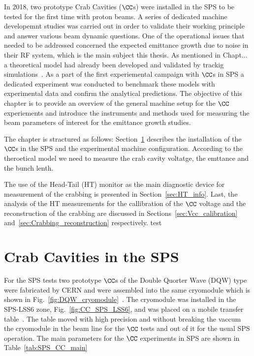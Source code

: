 \vspace*{-1mm}
In 2018, two prototype Crab Cavities ($\CC$s) were installed in the SPS to be tested for the first time with proton beams. A series of dedicated machine developemnt studies was carried out in order to validate their working principle and answer various beam dynamic questions. One of the operational issues that needed to be addressed concerned the expected emittance growth due to noise in their RF system, which is the main subject this thesis. As mentioned in Chapt... a theoretical model had already been developed and validated by trackig simulations~\cite{PhysRevSTAB.18.101001}. As a part of the first experiemental campaign with $\CC$s in SPS a dedicated experiment was conducted to benchmark these models with experimental data and confirm the analytical predictions. The objective of this chapter is to provide an overview of the general machine setup for the $\CC$ experiements and introduce the instruments and methods used for measuring the beam parameters of interest for the emittance growth studies.


The chapter is stractured as follows: Section~\ref{sec:CC_SPS_setup} describes the installation of the $\CC$s in the SPS and the experimental machine configuration. According to the theroetical model we need to measure the crab cavity voltatge, the emttance and the bunch lenth.


The use of the Head-Tail (HT) monitor as the main diagnostic device for measurement of the crabbing is presented in Section~\ref{sec:HT_info}. Last, the analysis of the HT measurements for the callibration of the $\CC$ voltage and the reconstruction of the crabbing are discussed in Sections~\ref{sec:Vcc_calibration} and~\ref{sec:Crabbing_reconstruction} respectively. test

\section{Crab Cavities in the SPS}\label{sec:CC_SPS_setup}

For the SPS tests two prototype $\CC$s of the Double Quorter Wave (DQW) type were fabricated by CERN and were assembled into the same cryomodule which is shown in Fig.~\ref{fig:DQW_cryomodule}~\cite{Zanoni:2017}. The cryomodule was installed in the SPS-LSS6 zone, Fig.~\ref{fig:CC_SPS_LSS6}, and was placed on a mobile transfer table~\cite{Calaga:2649807}. The table moved with high precision and without breaking the vaccum the cryomodule in the beam line for the $\CC$ tests and out of it for the usual SPS operation. The main parameters for the $\CC$ experiments in SPS are shown in Table~\ref{tab:SPS_CC_main}


